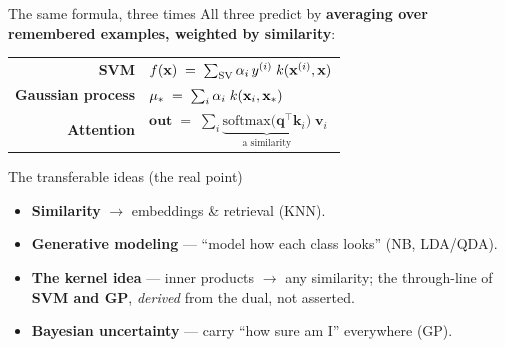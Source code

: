 \documentclass[aspectratio=169]{beamer}
\begin{document}
\begin{frame}{The same formula, three times}
  All three predict by \textbf{averaging over remembered examples, weighted by similarity}:
  \vskip 6pt
  \begin{center}
    \renewcommand{\arraystretch}{2.0}
    \begin{tabular}{@{}r l@{}}
      \textbf{SVM} &
        $f(\mathbf{x}) \;=\; \sum_{\text{SV}} \alpha_i\,y^{(i)}\; k(\mathbf{x}^{(i)}, \mathbf{x})$ \\
      \textbf{Gaussian process} &
        $\mu_* \;=\; \sum_i \alpha_i\; k(\mathbf{x}_i, \mathbf{x}_*)$ \\
      \textbf{Attention} &
        $\mathbf{out} \;=\; \sum_i \underbrace{\text{softmax}\big(\mathbf q^\top \mathbf k_i\big)}_{\text{a similarity}}\; \mathbf v_i$ \\
    \end{tabular}
  \end{center}
  \vfill
\end{frame}

\begin{frame}{The transferable ideas (the real point)}
  \begin{itemize}\small
    \item \textbf{Similarity} $\to$ embeddings \& retrieval (KNN).
    \item \textbf{Generative modeling} --- ``model how each class looks'' (NB, LDA/QDA).
    \item \textbf{The kernel idea} --- inner products $\to$ any similarity; the through-line of
      \textbf{SVM and GP}, \emph{derived} from the dual, not asserted.
    \item \textbf{Bayesian uncertainty} --- carry ``how sure am I'' everywhere (GP).
  \end{itemize}
  \vfill
\end{frame}
\end{document}
